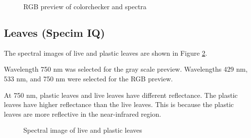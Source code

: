 \begin{figure}[H] %
  \centering
  \hspace{0.1cm}
  \caption[]{RGB preview of colorchecker and spectra }
  \label{fig:cc-rgb}
\end{figure}

\subsection{Leaves (Specim IQ)}

The spectral images of live and plastic leaves are shown in Figure \ref{fig:leaves}.

Wavelength 750 nm was selected for the gray scale preview.
Wavelengths 429 nm, 533 nm, and 750 nm were selected for the RGB preview.

At 750 nm, plastic leaves and live leaves have different reflectance. The plastic leaves have higher reflectance than the live leaves. This is because the plastic leaves are more reflective in the near-infrared region.

\begin{figure}[H] %
  \centering
  \hspace{0.1cm}
  \caption[]{Spectral image of live and plastic leaves }
  \label{fig:leaves}
\end{figure}

